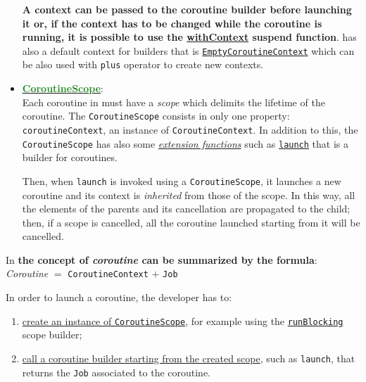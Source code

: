 \begin{itemize}
	\textbf{A context can be passed to the coroutine builder before launching it or, if the context has to be changed while the coroutine is running, it is possible to use the \href{https://kotlinlang.org/api/kotlinx.coroutines/kotlinx-coroutines-core/kotlinx.coroutines/with-context.html}{withContext} suspend function}.
	\Kotlin has also a default context for builders that is \href{https://kotlinlang.org/api/latest/jvm/stdlib/kotlin.coroutines/-empty-coroutine-context/}{\texttt{EmptyCoroutineContext}} which can be also used with \texttt{plus} operator to create new contexts.
	
	\item \href{https://kotlinlang.org/api/kotlinx.coroutines/kotlinx-coroutines-core/kotlinx.coroutines/-coroutine-scope/}{\underline{\textbf{\textcolor{ForestGreen}{CoroutineScope}}}}:\\
	Each coroutine in \Kotlin must have a \textit{scope} which delimits the lifetime of the coroutine. The \texttt{CoroutineScope} consists in only one property: \texttt{coroutineContext}, an instance of \texttt{CoroutineContext}.
	In addition to this, the \texttt{CoroutineScope} has also some \href{https://kotlinlang.org/docs/extensions.html}{\textit{extension functions}} such as \href{https://kotlinlang.org/api/kotlinx.coroutines/kotlinx-coroutines-core/kotlinx.coroutines/launch.html}{\texttt{launch}} that is a builder for coroutines.
	
	Then, when \texttt{launch} is invoked using a \texttt{CoroutineScope}, it launches a new coroutine and its context is \textit{inherited} from those of the scope.
	In this way, all the elements of the parents and its cancellation are propagated to the child; then, if a scope is cancelled, all the coroutine launched starting from it will be cancelled.
\end{itemize}

\begin{center}
	In \Kotlin \textbf{the concept of \textit{coroutine} can be summarized by the formula}:\\
		\textit{Coroutine} $=$ \texttt{CoroutineContext} $+$ \texttt{Job}
\end{center}

In order to launch a coroutine, the developer has to:
\begin{enumerate}
	\item \underline{create an instance of \texttt{CoroutineScope}}, for example using the \href{https://kotlinlang.org/api/kotlinx.coroutines/kotlinx-coroutines-core/kotlinx.coroutines/run-blocking.html}{\texttt{runBlocking}} scope builder;
	
	\item \underline{call a coroutine builder starting from the created scope}, such as \texttt{launch}, that returns the \texttt{Job} associated to the coroutine.
\end{enumerate}

